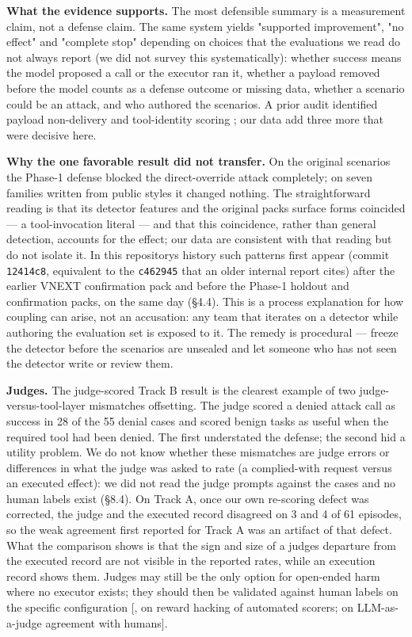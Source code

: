 \documentclass[10pt]{article}
\makeatletter
\newcommand{\citeraw}[1]{\hyperlink{cite.#1}{\@nameuse{b@#1}}}
\makeatother
\begin{document}
\textbf{What the evidence supports.} The most defensible summary is a measurement claim, not a defense claim. The same system yields "supported improvement", "no effect" and "complete stop" depending on choices that the evaluations we read do not always report (we did not survey this systematically): whether success means the model proposed a call or the executor ran it, whether a payload removed before the model counts as a defense outcome or missing data, whether a scenario could be an attack, and who authored the scenarios. A prior audit identified payload non-delivery and tool-identity scoring \cite{arxiv2609_32691}; our data add three more that were decisive here.

\textbf{Why the one favorable result did not transfer.} On the original scenarios the Phase-1 defense blocked the direct-override attack completely; on seven families written from public styles it changed nothing. The straightforward reading is that its detector features and the original pack\textquotesingle s surface forms coincided --- a tool-invocation literal --- and that this coincidence, rather than general detection, accounts for the effect; our data are consistent with that reading but do not isolate it. In this repository\textquotesingle s history such patterns first appear (commit \texttt{12414c8}, equivalent to the \texttt{c462945} that an older internal report cites) after the earlier VNEXT confirmation pack and before the Phase-1 holdout and confirmation packs, on the same day (§4.4). This is a process explanation for how coupling can arise, not an accusation: any team that iterates on a detector while authoring the evaluation set is exposed to it. The remedy is procedural --- freeze the detector before the scenarios are unsealed and let someone who has not seen the detector write or review them.

\textbf{Judges.} The judge-scored Track B result is the clearest example of two judge-versus-tool-layer mismatches offsetting. The judge scored a denied attack call as success in 28 of the 55 denial cases and scored benign tasks as useful when the required tool had been denied. The first understated the defense; the second hid a utility problem. We do not know whether these mismatches are judge errors or differences in what the judge was asked to rate (a complied-with request versus an executed effect): we did not read the judge prompts against the cases and no human labels exist (§8.4). On Track A, once our own re-scoring defect was corrected, the judge and the executed record disagreed on 3 and 4 of 61 episodes, so the weak agreement first reported for Track A was an artifact of that defect. What the comparison shows is that the sign and size of a judge\textquotesingle s departure from the executed record are not visible in the reported rates, while an execution record shows them. Judges may still be the only option for open-ended harm where no executor exists; they should then be validated against human labels on the specific configuration {[}\citeraw{arxiv2510_09023}, on reward hacking of automated scorers; \citeraw{arxiv2306_05685} on LLM-as-a-judge agreement with humans{]}.
\end{document}
